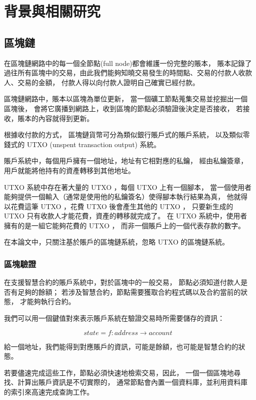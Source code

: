 \graphicspath{ {./images/} }
\chapter{背景與相關研究}
\label{c:background}


\section{區塊鏈}

在區塊鏈網路中的每一個全節點(full node)都會維護一份完整的賬本，
賬本記錄了過往所有區塊中的交易，由此我們能夠知曉交易發生的時間點、交易的付款人收款人、交易的金額，
付款人得以向付款人證明自己確實已經付款。

區塊鏈網路中，賬本以區塊為單位更新，
當一個礦工節點蒐集交易並挖掘出一個區塊後，
會將它廣播到網路上，收到區塊的節點必須驗證後決定是否接收，
若接收，賬本的內容就得到更新。

根據收付款的方式， 區塊鏈貨幣可分為類似銀行賬戶式的賬戶系統，
以及類似零錢式的 UTXO (unspent transaction output) 系統。

賬戶系統中，每個用戶擁有一個地址，地址有它相對應的私鑰，
經由私鑰簽章，用戶就能將他持有的資產轉移到其他地址。

UTXO 系統中存在著大量的 UTXO ，每個 UTXO 上有一個腳本，
當一個使用者能夠提供一個輸入（通常是使用他的私鑰簽名）使得腳本執行結果為真，
他就得以花費這筆 UTXO ，花費 UTXO 後會產生其他的 UTXO ，
只要新生成的 UTXO 只有收款人才能花費，資產的轉移就完成了。
在 UTXO 系統中，使用者擁有的是一組它能夠花費的 UTXO ，
而非一個賬戶上的一個代表存款的數字。

在本論文中，只關注基於賬戶的區塊鏈系統，忽略 UTXO 的區塊鏈系統。

\subsection{區塊驗證}

在支援智慧合約的賬戶系統中，對於區塊中的一般交易，
節點必須知道付款人是否有足夠的餘額；
若涉及智慧合約，節點需要獲取合約程式碼以及合約當前的狀態，
才能夠執行合約。

我們可以用一個鍵值對來表示賬戶系統在驗證交易時所需要儲存的資訊：

\[state = f: address\to account \]

給一個地址，我們能得到對應賬戶的資訊，可能是餘額，也可能是智慧合約的狀態。

若要儘速完成這些工作，節點必須快速地檢索交易，因此，
一個一個區塊地尋找、計算出賬戶資訊是不切實際的， 
通常節點會內置一個資料庫，並利用資料庫的索引來高速完成查詢工作。

